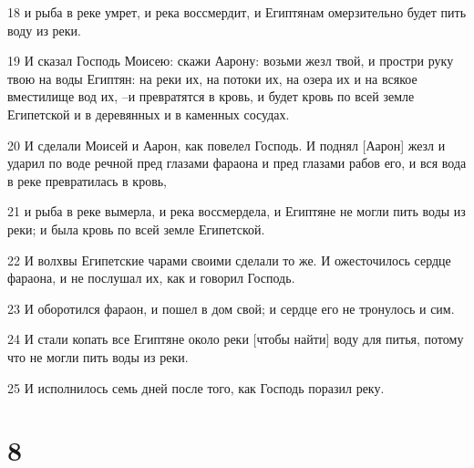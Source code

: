 \par 18 и рыба в реке умрет, и река воссмердит, и Египтянам омерзительно будет пить воду из реки.
\par 19 И сказал Господь Моисею: скажи Аарону: возьми жезл твой, и простри руку твою на воды Египтян: на реки их, на потоки их, на озера их и на всякое вместилище вод их, --и превратятся в кровь, и будет кровь по всей земле Египетской и в деревянных и в каменных сосудах.
\par 20 И сделали Моисей и Аарон, как повелел Господь. И поднял [Аарон] жезл и ударил по воде речной пред глазами фараона и пред глазами рабов его, и вся вода в реке превратилась в кровь,
\par 21 и рыба в реке вымерла, и река воссмердела, и Египтяне не могли пить воды из реки; и была кровь по всей земле Египетской.
\par 22 И волхвы Египетские чарами своими сделали то же. И ожесточилось сердце фараона, и не послушал их, как и говорил Господь.
\par 23 И оборотился фараон, и пошел в дом свой; и сердце его не тронулось и сим.
\par 24 И стали копать все Египтяне около реки [чтобы найти] воду для питья, потому что не могли пить воды из реки.
\par 25 И исполнилось семь дней после того, как Господь поразил реку.

\chapter{8}

